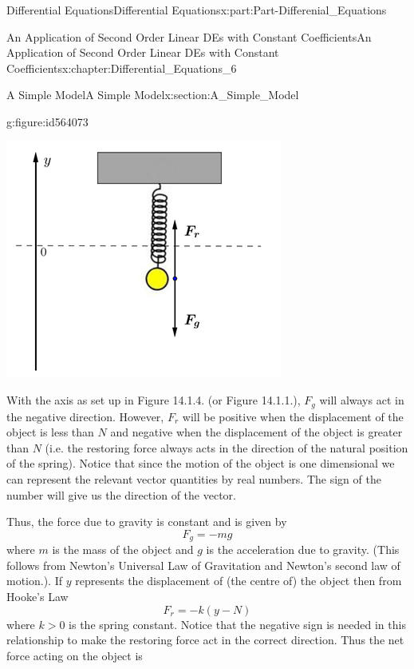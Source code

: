 \documentclass[oneside,10pt,]{book}
\newcommand{\terminology}[1]{\textbf{#1}}
\numberwithin{equation}{section}
\newcommand{\gt}{>}
\begin{document}
\begin{partptx}{Differential Equations}{}{Differential Equations}{}{}{x:part:Part-Differenial_Equations}
\begin{chapterptx}{An Application of Second Order Linear DEs with Constant Coefficients}{}{An Application of Second Order Linear DEs with Constant Coefficients}{}{}{x:chapter:Differential_Equations_6}
\begin{sectionptx}{A Simple Model}{}{A Simple Model}{}{}{x:section:A_Simple_Model}
\begin{figureptx}{}{g:figure:id564073}{}
\begin{image}{0.2}{0.6}{0.2}%
\includegraphics[width=\linewidth]{./DifferentialEquations/Images/6/figure_2.png}
\end{image}%
\tcblower
\end{figureptx}%
 With the axis as set up in Figure 14.1.4. (or Figure 14.1.1.), \terminology{\(F_g\)} will always act in the negative direction. However, \terminology{\(F_r\)} will be positive when the displacement of the object is less than \(N\) and negative when the displacement of the object is greater than \(N\) (i.e. the restoring force always acts in the direction of the natural position of the spring). Notice that since the motion of the object is one dimensional we can represent the relevant vector quantities by real numbers. The sign of the number will give us the direction of the vector.%
\par
Thus, the force due to gravity is constant and is given by%
\begin{equation*}
F_g=-mg
\end{equation*}
where \(m\) is the mass of the object and \(g\) is the acceleration due to gravity. (This follows from Newton’s Universal Law of Gravitation and Newton’s second law of motion.). If \(y\) represents the displacement of (the centre of) the object then from Hooke's Law%
\begin{equation*}
F_r=-k(y-N)
\end{equation*}
where \(k\gt 0\) is the spring constant. Notice that the negative sign is needed in this relationship to make the restoring force act in the correct direction. Thus the net force acting on the object is%

\end{sectionptx}
\end{chapterptx}
\end{partptx}
\end{document}
